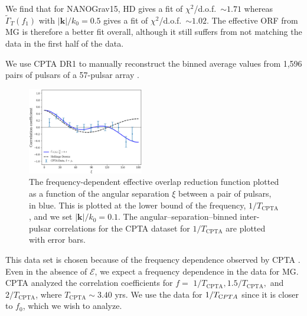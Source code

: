 \documentclass[prd,twocolumn,aps,psfig,nofootinbib,nobibnotes,superscriptaddress,preprintnumbers,times]{revtex4-2}
\begin{document}
We find that for NANOGrav15, HD gives a fit of $\chi^2$/d.o.f.\ $\sim 1.71$ whereas $\tilde{\Gamma}_T(f_1)$ with $|\boldsymbol{k}|/k_0 = 0.5$ gives a fit of $\chi^2$/d.o.f.\ $\sim 1.02$. The effective ORF from MG  is therefore a better fit overall, although it still suffers from not matching the data in the first half of the data.

We use CPTA DR1 to manually reconstruct the binned average values from 1,596 pairs of pulsars of a 57-pulsar array \cite{Xu:2023wog}. 
\begin{figure}[ht]
    \centering
    \includegraphics[width=0.45\textwidth]{fig3.pdf}
    \caption{The frequency-dependent effective overlap reduction function plotted as a function of the angular separation $\xi$ between a pair of pulsars, in blue. This is plotted at the lower bound of the frequency, $1/T_{\text{CPTA}}$, and we set $|\boldsymbol{k}|/k_0 = 0.1$. The angular–separation–binned inter-pulsar correlations for the CPTA dataset for $1/T_{\text{CPTA}}$ are plotted with error bars.}
    \label{fig:cpta}
\end{figure}
This data set is chosen because of the frequency dependence observed by CPTA \cite{Xu:2023wog}. Even in the absence of $\mathcal{E}$, we expect a frequency dependence in the data for MG. CPTA analyzed the correlation coefficients for $f=$ $1/T_{\text{CPTA}}, 1.5/T_{\text{CPTA}},$ and $2/T_{\text{CPTA}}$, where $T_{\text{CPTA}} \sim 3.40$ yrs. We use the data for $1/T_{\text CPTA}$ since it is closer to $f_0$, which we wish to analyze. 
\end{document}
